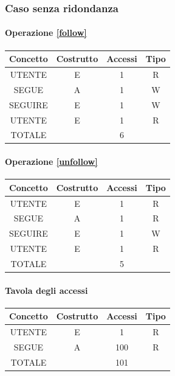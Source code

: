 \documentclass[a4paper,12pt]{report}
\begin{document}
\subsubsection{Caso senza ridondanza}
\begin{table}[H]
  \paragraph{Operazione \ref{follow}\newline}
\begin{tabular}{|c|c|c|c|}
\hline
Concetto & Costrutto & Accessi & Tipo \\ \hline
UTENTE   & E         & 1       & R    \\ \hline
SEGUE    & A         & 1       & W    \\ \hline
SEGUIRE  & E         & 1       & W    \\ \hline
UTENTE   & E         & 1       & R    \\ \hline
TOTALE   &           & 6       &      \\ \hline
\end{tabular}
\end{table}
\begin{table}[H]
  \paragraph{Operazione \ref{unfollow}\newline}
\begin{tabular}{|c|c|c|c|}
\hline
Concetto & Costrutto & Accessi & Tipo \\ \hline
UTENTE   & E         & 1       & R    \\ \hline
SEGUE    & A         & 1       & R    \\ \hline
SEGUIRE  & E         & 1       & W    \\ \hline
UTENTE   & E         & 1       & R    \\ \hline
TOTALE   &           & 5       &      \\ \hline
\end{tabular}
\end{table}

\begin{table}[H]
\paragraph{Tavola degli accessi\newline}
\begin{tabular}{|c|c|c|c|}
\hline
Concetto & Costrutto & Accessi & Tipo \\ \hline
UTENTE   & E         & 1       & R    \\ \hline
SEGUE    & A         & 100     & R    \\ \hline
TOTALE   &           & 101     &      \\ \hline
\end{tabular}
\end{table}
\end{document}
